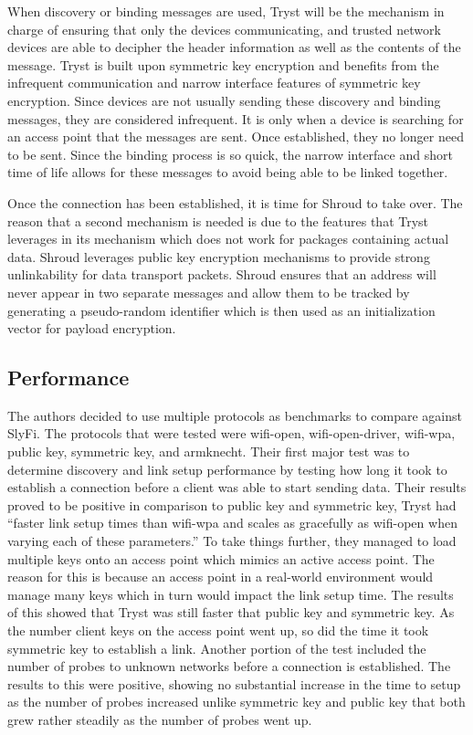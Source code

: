 \smallskip

When discovery or binding messages are used, Tryst will be the mechanism in charge of ensuring that only the devices communicating, and trusted network devices are able to decipher the header information as well as the contents of the message. Tryst is built upon symmetric key encryption and benefits from the infrequent communication and narrow interface features of symmetric key encryption. Since devices are not usually sending these discovery and binding messages, they are considered infrequent. It is only when a device is searching for an access point that the messages are sent. Once established, they no longer need to be sent. Since the binding process is so quick, the narrow interface and short time of life allows for these messages to avoid being able to be linked together.

\smallskip

Once the connection has been established, it is time for Shroud to take over. The reason that a second mechanism is needed is due to the features that Tryst leverages in its mechanism which does not work for packages containing actual data. Shroud leverages public key encryption mechanisms to provide strong unlinkability for data transport packets. Shroud ensures that an address will never appear in two separate messages and allow them to be tracked by generating a pseudo-random identifier which is then used as an initialization vector for payload encryption. 

\subsection {Performance} 
\smallskip

The authors decided to use multiple protocols as benchmarks to compare against SlyFi. The protocols that were tested were wifi-open, wifi-open-driver, wifi-wpa, public key, symmetric key, and armknecht. Their first major test was to determine discovery and link setup performance by testing how long it took to establish a connection before a client was able to start sending data. Their results proved to be positive in comparison to public key and symmetric key, Tryst had “faster link setup times than wifi-wpa and scales as gracefully as wifi-open when varying each of these parameters.” \cite {greenstein2008improving} To take things further, they managed to load multiple keys onto an access point which mimics an active access point. The reason for this is because an access point in a real-world environment would manage many keys which in turn would impact the link setup time. The results of this showed that Tryst was still faster that public key and symmetric key. As the number client keys on the access point went up, so did the time it took symmetric key to establish a link. Another portion of the test included the number of probes to unknown networks before a connection is established. The results to this were positive, showing no substantial increase in the time to setup as the number of probes increased unlike symmetric key and public key that both grew rather steadily as the number of probes went up.

